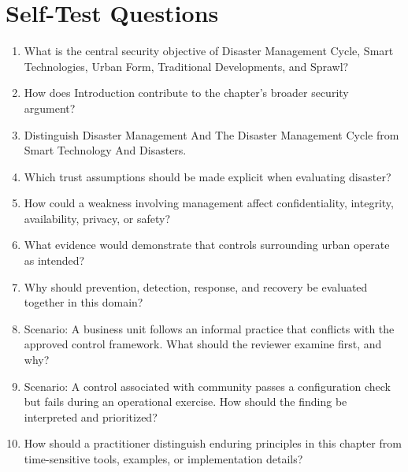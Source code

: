 \documentclass[11pt]{article}
\begin{document}
\section*{Self-Test Questions}
\begin{enumerate}
\item What is the central security objective of Disaster Management Cycle, Smart Technologies, Urban Form, Traditional Developments, and Sprawl?
\item How does Introduction contribute to the chapter's broader security argument?
\item Distinguish Disaster Management And The Disaster Management Cycle from Smart Technology And Disasters.
\item Which trust assumptions should be made explicit when evaluating disaster?
\item How could a weakness involving management affect confidentiality, integrity, availability, privacy, or safety?
\item What evidence would demonstrate that controls surrounding urban operate as intended?
\item Why should prevention, detection, response, and recovery be evaluated together in this domain?
\item Scenario: A business unit follows an informal practice that conflicts with the approved control framework. What should the reviewer examine first, and why?
\item Scenario: A control associated with community passes a configuration check but fails during an operational exercise. How should the finding be interpreted and prioritized?
\item How should a practitioner distinguish enduring principles in this chapter from time-sensitive tools, examples, or implementation details?
\end{enumerate}
\end{document}
